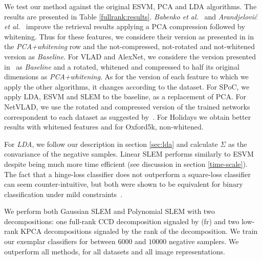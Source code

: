 We test our method against the original ESVM, PCA and LDA algorithms. The results are presented in Table \ref{fullrank:results}.
\textit{Babenko et al.}~\cite{babenko15} and \textit{Arandjelovi\'c et al.}~\cite{Arandjelovic15} improve the retrieval results applying a PCA compression followed by whitening. 
Thus for these features, we considere their version as presented in \cite{Arandjelovic15,babenko15} in the \textit{PCA+whitening} row and the not-compressed, not-rotated and not-whitened version as \textit{Baseline}. 
For VLAD and AlexNet, we considere the version presented in~\cite{ZePe15} as \textit{Baseline} and a rotated, whitened and compressed to half its original dimensions as \textit{PCA+whitening}. 
As for the version of each feature to which we apply the other algorithms, it changes according to the dataset. 
For SPoC, we apply LDA, ESVM and SLEM to the baseline, as a replacement of PCA. 
For NetVLAD, we use the rotated and compressed version of the trained networks correspondent to each dataset as suggested by~\cite{Arandjelovic15}. 
For Holidays we obtain better results with whitened features and for Oxford5k, non-whitened.

For \textit{LDA}, we follow our description in section \ref{sec:lda} and calculate $\Sigma$ as the convariance of the negative samples.
Linear SLEM performs similarly to ESVM despite being much more time efficient (see discussion in section \ref{time-scale}). 
The fact that a hinge-loss classifier does not outperform a square-loss classifier can seem counter-intuitive, but both were shown to be equivalent for binary classification under mild constraints~\cite{YeXi07}.

We perform both Gaussian SLEM and Polynomial SLEM with two decompositions: one full-rank CCD decomposition signaled by (fr) and two low-rank KPCA decompositions signaled by the rank of the decomposition. 
We train our exemplar classifiers for between $6000$ and $10000$ negative samplers. We outperform all methods, for all datasets and all image representations. 


